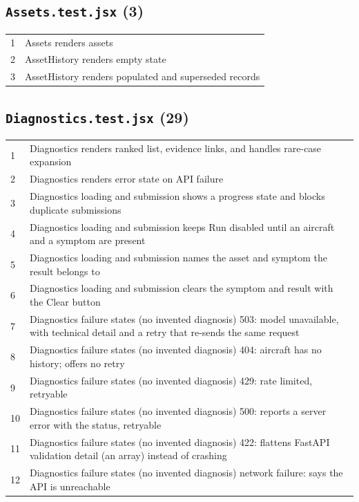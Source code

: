 \subsection*{\texttt{Assets.test.jsx} (3)}
\begin{longtable}{p{}p{}}
1 & Assets renders assets \\
2 & AssetHistory renders empty state \\
3 & AssetHistory renders populated and superseded records \\
\end{longtable}
\subsection*{\texttt{Diagnostics.test.jsx} (29)}
\begin{longtable}{p{}p{}}
1 & Diagnostics renders ranked list, evidence links, and handles rare-case expansion \\
2 & Diagnostics renders error state on API failure \\
3 & Diagnostics loading and submission shows a progress state and blocks duplicate submissions \\
4 & Diagnostics loading and submission keeps Run disabled until an aircraft and a symptom are present \\
5 & Diagnostics loading and submission names the asset and symptom the result belongs to \\
6 & Diagnostics loading and submission clears the symptom and result with the Clear button \\
7 & Diagnostics failure states (no invented diagnosis) 503: model unavailable, with technical detail and a retry that re-sends the same request \\
8 & Diagnostics failure states (no invented diagnosis) 404: aircraft has no history; offers no retry \\
9 & Diagnostics failure states (no invented diagnosis) 429: rate limited, retryable \\
10 & Diagnostics failure states (no invented diagnosis) 500: reports a server error with the status, retryable \\
11 & Diagnostics failure states (no invented diagnosis) 422: flattens FastAPI validation detail (an array) instead of crashing \\
12 & Diagnostics failure states (no invented diagnosis) network failure: says the API is unreachable \\

\end{longtable}
